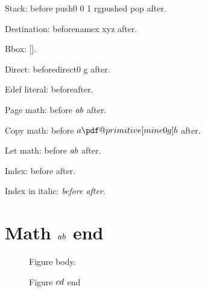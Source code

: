 \documentclass{article}
\makeatletter
\newcommand\litb{\pdf@primitive\pdfliteral{0 g}}
\let\myprim\pdfprimitive
\newcommand\litc{\myprim\pdfliteral{0 g}}
\makeatother
\begin{document}
Stack: before\pdfprimitive{} push{0 0 1 rg}pushed\pdfprimitive{} pop{} after.

Destination: before\pdfprimitive\pdfdest name{x} xyz after.

Bbox: [\pdfprimitive\pdfximagebbox\pdfprimitive{}].

Direct: before\pdfprimitive\pdfliteral direct{0 g} after.

Edef literal: \edef\lx{\pdfprimitive{}}before\lx after.

Page math: before $a\pdfprimitive\pdfliteral page{0 g}b$ after.

Copy math: before $a\litb b$ after.

Let math: before $a\litc b$ after.

Index: before after.

Index in italic: \textit{before after}.

\section{Math $a\pdfprimitive\pdfliteral{0 g}b$ end}

\begin{figure}[h]
Figure body.
\caption{Figure $c\pdfprimitive\pdfliteral{0 g}d$ end}
\end{figure}
\printindex
\end{document}
